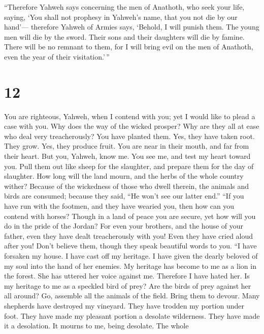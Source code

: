  ``Therefore Yahweh says concerning the men of Anathoth,
who seek your life, saying, `You shall not prophesy in Yahweh's name,
that you not die by our hand'---  therefore Yahweh of
Armies says, `Behold, I will punish them. The young men will die by the
sword. Their sons and their daughters will die by famine. 
There will be no remnant to them, for I will bring evil on the men of
Anathoth, even the year of their visitation.'\,''

\hypertarget{section-11}{%
\section{12}\label{section-11}}

 You are righteous, Yahweh, when I contend with you; yet I
would like to plead a case with you. Why does the way of the wicked
prosper? Why are they all at ease who deal very treacherously?
 You have planted them. Yes, they have taken root. They
grow. Yes, they produce fruit. You are near in their mouth, and far from
their heart.  But you, Yahweh, know me. You see me, and test
my heart toward you. Pull them out like sheep for the slaughter, and
prepare them for the day of slaughter.  How long will the
land mourn, and the herbs of the whole country wither? Because of the
wickedness of those who dwell therein, the animals and birds are
consumed; because they said, ``He won't see our latter end.''
 ``If you have run with the footmen, and they have wearied
you, then how can you contend with horses? Though in a land of peace you
are secure, yet how will you do in the pride of the Jordan? 
For even your brothers, and the house of your father, even they have
dealt treacherously with you! Even they have cried aloud after you!
Don't believe them, though they speak beautiful words to you.
 ``I have forsaken my house. I have cast off my heritage. I
have given the dearly beloved of my soul into the hand of her enemies.
 My heritage has become to me as a lion in the forest. She
has uttered her voice against me. Therefore I have hated her.
 Is my heritage to me as a speckled bird of prey? Are the
birds of prey against her all around? Go, assemble all the animals of
the field. Bring them to devour.  Many shepherds have
destroyed my vineyard. They have trodden my portion under foot. They
have made my pleasant portion a desolate wilderness.  They
have made it a desolation. It mourns to me, being desolate. The whole
